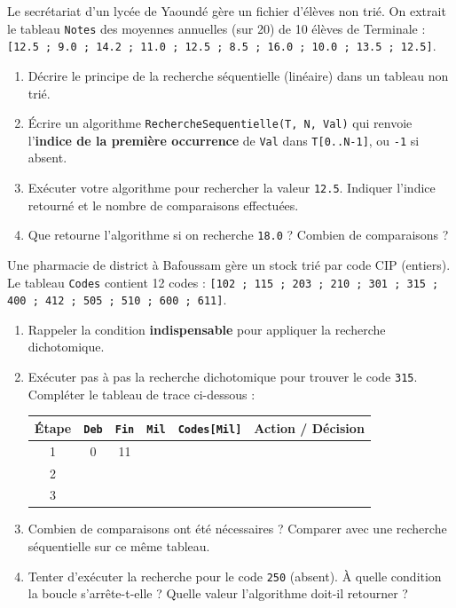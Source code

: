 \documentclass[11pt]{article}
\begin{document}
\begin{exercice}
Le secrétariat d'un lycée de Yaoundé gère un fichier d'élèves non trié. On extrait le tableau \texttt{Notes} des moyennes annuelles (sur 20) de 10 élèves de Terminale : 
\texttt{[12.5 ; 9.0 ; 14.2 ; 11.0 ; 12.5 ; 8.5 ; 16.0 ; 10.0 ; 13.5 ; 12.5]}.
\begin{enumerate}
    \item Décrire le principe de la recherche séquentielle (linéaire) dans un tableau non trié.
    \item Écrire un algorithme \texttt{RechercheSequentielle(T, N, Val)} qui renvoie l'\textbf{indice de la première occurrence} de \texttt{Val} dans \texttt{T[0..N-1]}, ou \texttt{-1} si absent.
    \item Exécuter votre algorithme pour rechercher la valeur \texttt{12.5}. Indiquer l'indice retourné et le nombre de comparaisons effectuées.
    \item Que retourne l'algorithme si on recherche \texttt{18.0} ? Combien de comparaisons ?
\end{enumerate}
\end{exercice}

\begin{exercice}
Une pharmacie de district à Bafoussam gère un stock trié par code CIP (entiers). Le tableau \texttt{Codes} contient 12 codes : 
\texttt{[102 ; 115 ; 203 ; 210 ; 301 ; 315 ; 400 ; 412 ; 505 ; 510 ; 600 ; 611]}.
\begin{enumerate}
    \item Rappeler la condition \textbf{indispensable} pour appliquer la recherche dichotomique.
    \item Exécuter pas à pas la recherche dichotomique pour trouver le code \texttt{315}. Compléter le tableau de trace ci-dessous :
    \begin{center}
    \begin{tabular}{|c|c|c|c|c|c|}
    \hline
    Étape & \texttt{Deb} & \texttt{Fin} & \texttt{Mil} & \texttt{Codes[Mil]} & Action / Décision \\
    \hline
    1 & 0 & 11 & & & \\
    \hline
    2 & & & & & \\
    \hline
    3 & & & & & \\
    \hline
    \end{tabular}
    \end{center}
    \item Combien de comparaisons ont été nécessaires ? Comparer avec une recherche séquentielle sur ce même tableau.
    \item Tenter d'exécuter la recherche pour le code \texttt{250} (absent). À quelle condition la boucle s'arrête-t-elle ? Quelle valeur l'algorithme doit-il retourner ?
\end{enumerate}
\end{exercice}
\end{document}
